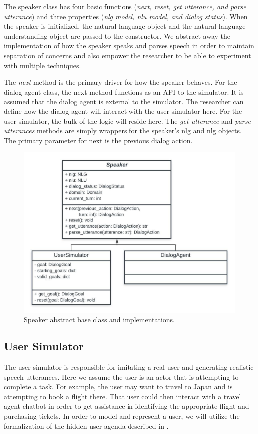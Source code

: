 The speaker class has four basic functions (\textit{next, reset, get utterance, and parse utterance}) and three properties (\textit{nlg model, nlu model, and dialog status}). When the speaker is initialized, the natural language object and the natural language understanding object are passed to the constructor. We abstract away the implementation of how the speaker speaks and parses speech in order to maintain separation of concerns and also empower the researcher to be able to experiment with multiple techniques. 

The \textit{next} method is the primary driver for how the speaker behaves. For the dialog agent class, the next method functions as an API to the simulator. It is assumed that the dialog agent is external to the simulator. The researcher can define how the dialog agent will interact with the user simulator here. For the user simulator, the bulk of the logic will reside here. The \textit{get utterance} and \textit{parse utterances} methods are simply wrappers for the speaker's nlg and nlg objects. The primary parameter for next is the previous dialog action. 

\begin{figure}[h!]
	\centering
	\includegraphics[width=\linewidth]{diagrams/speaker_classes.jpeg}
	\caption{ Speaker abstract base class and implementations.}
	\label{fig:speaker_class}
\end{figure}

\subsection{User Simulator}
The user simulator is responsible for imitating a real user and generating realistic speech utterances. Here we assume the user is an actor that is attempting to complete a task. For example, the user may want to travel to Japan and is attempting to book a flight there. That user could then interact with a travel agent chatbot in order to get assistance in identifying the appropriate flight and purchasing tickets. In order to model and represent a user, we will utilize the formalization of the hidden user agenda described in \cite{Schatzmann2009TheHA}.

